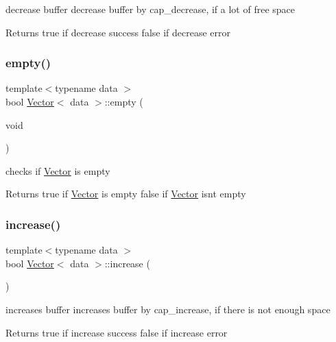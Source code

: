 decrease buffer  decrease buffer by cap\+\_\+decrease, if a lot of free space 

\begin{DoxyReturn}{Returns}
true if decrease success false if decrease error 
\end{DoxyReturn}
\mbox{\label{classVector_ae203aae4d9a6dbabd4883c9e6fd84f79}} 
\subsubsection{\texorpdfstring{empty()}{empty()}}
{\footnotesize\ttfamily template$<$typename data $>$ \\
bool \hyperlink{classVector}{Vector}$<$ data $>$\+::empty (\begin{DoxyParamCaption}\item[{void}]{ }\end{DoxyParamCaption})}



checks if \hyperlink{classVector}{Vector} is empty 

\begin{DoxyReturn}{Returns}
true if \hyperlink{classVector}{Vector} is empty false if \hyperlink{classVector}{Vector} isn\textquotesingle{}t empty 
\end{DoxyReturn}
\mbox{\label{classVector_afa2a3c5660a7a34794975a6bb80d175f}} 
\subsubsection{\texorpdfstring{increase()}{increase()}}
{\footnotesize\ttfamily template$<$typename data $>$ \\
bool \hyperlink{classVector}{Vector}$<$ data $>$\+::increase (\begin{DoxyParamCaption}{ }\end{DoxyParamCaption})\hspace{0.3cm}{\ttfamily [private]}}



increases buffer  increases buffer by cap\+\_\+increase, if there is not enough space 

\begin{DoxyReturn}{Returns}
true if increase success false if increase error 
\end{DoxyReturn}
\mbox{\label{classVector_a7994afefee442d3980f1b1125152fe50}} 
